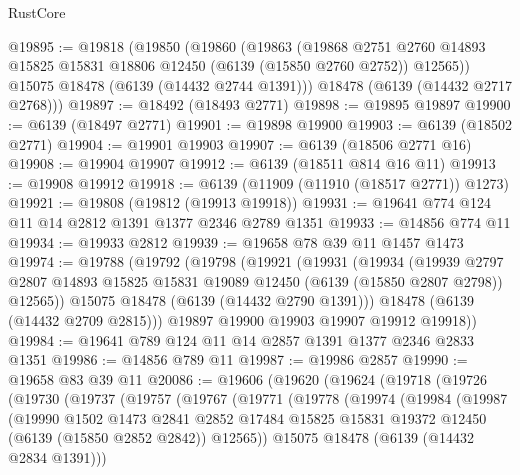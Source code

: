 \begin{lexlean}{RustCore}
\begin{coremodule}
@19895 := @19818
    (@19850
      (@19860
        (@19863
          (@19868
            @2751
            @2760
            @14893
            @15825
            @15831
            @18806
            @12450
            (@6139 (@15850 @2760 @2752))
            @12565))
        @15075
        @18478
        (@6139 (@14432 @2744 @1391)))
      @18478
      (@6139 (@14432 @2717 @2768)))
@19897 := @18492 (@18493 @2771)
@19898 := @19895 @19897
@19900 := @6139 (@18497 @2771)
@19901 := @19898 @19900
@19903 := @6139 (@18502 @2771)
@19904 := @19901 @19903
@19907 := @6139 (@18506 @2771 @16)
@19908 := @19904 @19907
@19912 := @6139 (@18511 @814 @16 @11)
@19913 := @19908 @19912
@19918 := @6139 (@11909 (@11910 (@18517 @2771)) @1273)
@19921 := @19808 (@19812 (@19913 @19918))
@19931 := @19641 @774 @124 @11 @14 @2812 @1391 @1377 @2346 @2789 @1351
@19933 := @14856 @774 @11
@19934 := @19933 @2812
@19939 := @19658 @78 @39 @11 @1457 @1473
@19974 := @19788
    (@19792
      (@19798
        (@19921
          (@19931
            (@19934
              (@19939
                @2797
                @2807
                @14893
                @15825
                @15831
                @19089
                @12450
                (@6139 (@15850 @2807 @2798))
                @12565))
            @15075
            @18478
            (@6139 (@14432 @2790 @1391)))
          @18478
          (@6139 (@14432 @2709 @2815)))
        @19897
        @19900
        @19903
        @19907
        @19912
        @19918))
@19984 := @19641 @789 @124 @11 @14 @2857 @1391 @1377 @2346 @2833 @1351
@19986 := @14856 @789 @11
@19987 := @19986 @2857
@19990 := @19658 @83 @39 @11
@20086 := @19606
    (@19620
      (@19624
        (@19718
          (@19726
            (@19730
              (@19737
                (@19757
                  (@19767
                    (@19771
                      (@19778
                        (@19974
                          (@19984
                            (@19987
                              (@19990
                                @1502
                                @1473
                                @2841
                                @2852
                                @17484
                                @15825
                                @15831
                                @19372
                                @12450
                                (@6139 (@15850 @2852 @2842))
                                @12565))
                            @15075
                            @18478
                            (@6139 (@14432 @2834 @1391)))

\end{coremodule}
\end{lexlean}
